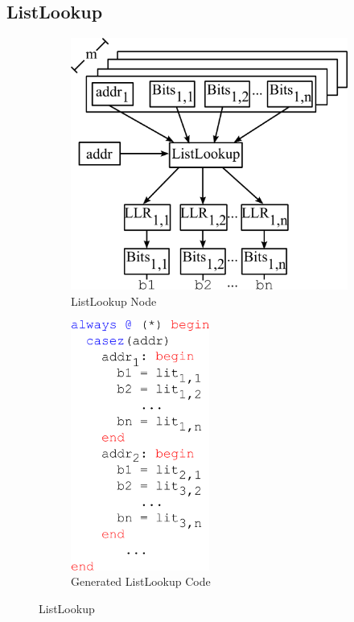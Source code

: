 \subsection{ListLookup}
\begin{figure}[hb]
\centering
  \begin{subfigure}[t]{0.48\textwidth}
  \centering
  \includegraphics[width=\textwidth]{figures/listlookupnode.pdf}
  \caption{ListLookup Node}
  \label{fig:llnode}
  \end{subfigure}
  \hfill
  \begin{subfigure}[t]{0.48\textwidth}
  \centering
  \includegraphics[width=0.5\textwidth]{figures/listlookupv.pdf}
  \caption{Generated ListLookup Code}
  \label{fig:llv}
  \end{subfigure}
\caption{ListLookup}
\label{fig:ll}
\end{figure}

